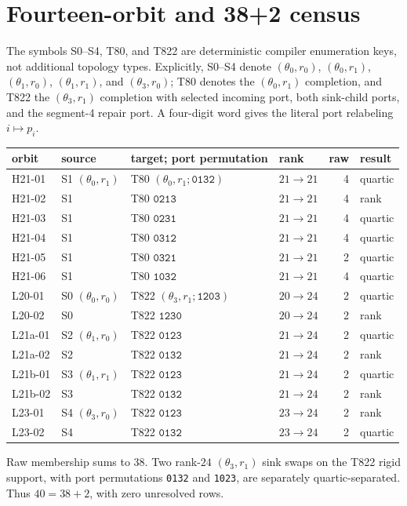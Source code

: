 \documentclass[10pt]{article}
\begin{document}
\section{Fourteen-orbit and 38+2 census}

The symbols S0--S4, T80, and T822 are deterministic compiler enumeration
keys, not additional topology types.  Explicitly,
S0--S4 denote \((\theta_0,r_0)\), \((\theta_0,r_1)\),
\((\theta_1,r_0)\), \((\theta_1,r_1)\), and \((\theta_3,r_0)\);
T80 denotes the \((\theta_0,r_1)\) completion, and T822 the
\((\theta_3,r_1)\) completion with selected incoming port, both sink-child
ports, and the segment-4 repair port.  A four-digit word gives the literal
port relabeling \(i\mapsto p_i\).

\begin{longtable}{llllrl}
\toprule
orbit & source & target; port permutation & rank & raw & result\\
\midrule
\endhead
H21-01 & S1 \((\theta_0,r_1)\) & T80 \((\theta_0,r_1;\texttt{0132})\) & \(21\to21\)&4&quartic\\
H21-02 & S1 & T80 \(\texttt{0213}\) & \(21\to21\)&4&rank\\
H21-03 & S1 & T80 \(\texttt{0231}\) & \(21\to21\)&4&quartic\\
H21-04 & S1 & T80 \(\texttt{0312}\) & \(21\to21\)&4&quartic\\
H21-05 & S1 & T80 \(\texttt{0321}\) & \(21\to21\)&2&quartic\\
H21-06 & S1 & T80 \(\texttt{1032}\) & \(21\to21\)&4&quartic\\
L20-01 & S0 \((\theta_0,r_0)\) & T822 \((\theta_3,r_1;\texttt{1203})\)&\(20\to24\)&2&quartic\\
L20-02 & S0 & T822 \(\texttt{1230}\)&\(20\to24\)&2&rank\\
L21a-01 & S2 \((\theta_1,r_0)\)&T822 \(\texttt{0123}\)&\(21\to24\)&2&quartic\\
L21a-02 & S2&T822 \(\texttt{0132}\)&\(21\to24\)&2&rank\\
L21b-01 & S3 \((\theta_1,r_1)\)&T822 \(\texttt{0123}\)&\(21\to24\)&2&quartic\\
L21b-02 & S3&T822 \(\texttt{0132}\)&\(21\to24\)&2&rank\\
L23-01 & S4 \((\theta_3,r_0)\)&T822 \(\texttt{0123}\)&\(23\to24\)&2&rank\\
L23-02 & S4&T822 \(\texttt{0132}\)&\(23\to24\)&2&quartic\\
\bottomrule
\end{longtable}

Raw membership sums to 38.  Two rank-\(24\) \((\theta_3,r_1)\) sink
swaps on the T822 rigid support, with port permutations \texttt{0132} and
\texttt{1023}, are separately
quartic-separated.  Thus \(40=38+2\), with zero unresolved rows.
\end{document}
